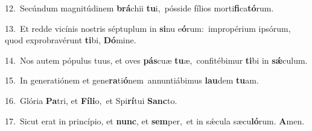 {\numbfont\textcolor{\numbcolor}{12.}}~Secúndum magnitúdinem \textbf{brá}\-chii \textbf{tu}\-i,~\star pósside fílios morti\-\textbf{fi}\-ca\-\textbf{tó}\-rum.\par
{\numbfont\textcolor{\numbcolor}{13.}}~Et redde vicínis nostris séptuplum in \textbf{si}\-nu e\-\textbf{ó}\-rum:~\star impropérium ipsórum, quod exprobravérunt \textbf{ti}\-bi, \textbf{Dó}\-mine.\par
{\numbfont\textcolor{\numbcolor}{14.}}~Nos autem pópulus tuus, et oves \textbf{pás}\-cuæ \textbf{tu}\-æ,~\star confitébimur \textbf{ti}\-bi in \textbf{sǽ}\-culum.\par
{\numbfont\textcolor{\numbcolor}{15.}}~In generatiónem et gene\-\textbf{ra}\-ti\-\textbf{ó}\-nem~\star annuntiábimus \textbf{lau}\-dem \textbf{tu}\-am.\par
{\numbfont\textcolor{\numbcolor}{16.}}~Glória \textbf{Pa}\-tri, et \textbf{Fí}\-\textbf{li}o,~\star et Spi\-\textbf{rí}\-tui \textbf{Sanc}\-to.\par
{\numbfont\textcolor{\numbcolor}{17.}}~Sicut erat in princípio, et \textbf{nunc}\-, et \textbf{sem}\-per,~\star et in sǽcula sæcu\-\textbf{ló}\-rum. \textbf{A}\-men.\par
